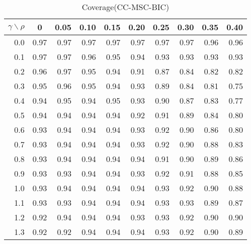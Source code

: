 \documentclass[12pt]{article}
\begin{document}
%
\begin{table}[!tbp]
\caption{Coverage(CC-MSC-BIC)}
 \begin{center}
 \begin{tabular}{r|rrrrrrrrr}\hline\hline
\multicolumn{1}{c|}{$\gamma\backslash\rho$}&\multicolumn{1}{c}{0}&\multicolumn{1}{c}{0.05}&\multicolumn{1}{c}{0.10}&\multicolumn{1}{c}{0.15}&\multicolumn{1}{c}{0.20}&\multicolumn{1}{c}{0.25}&\multicolumn{1}{c}{0.30}&\multicolumn{1}{c}{0.35}&\multicolumn{1}{c}{0.40}\tabularnewline
\hline

0.0&0.97&0.97&0.97&0.97&0.97&0.97&0.97&0.96&0.96\tabularnewline
0.1&0.97&0.97&0.96&0.95&0.94&0.93&0.93&0.93&0.93\tabularnewline
0.2&0.96&0.97&0.95&0.94&0.91&0.87&0.84&0.82&0.82\tabularnewline
0.3&0.95&0.96&0.95&0.94&0.93&0.89&0.84&0.81&0.75\tabularnewline
0.4&0.94&0.95&0.94&0.95&0.93&0.90&0.87&0.83&0.77\tabularnewline
0.5&0.94&0.94&0.94&0.94&0.92&0.91&0.89&0.84&0.80\tabularnewline
0.6&0.93&0.94&0.94&0.94&0.93&0.92&0.90&0.86&0.80\tabularnewline
0.7&0.93&0.94&0.94&0.94&0.93&0.92&0.90&0.88&0.83\tabularnewline
0.8&0.93&0.94&0.94&0.94&0.94&0.91&0.90&0.89&0.86\tabularnewline
0.9&0.93&0.93&0.94&0.94&0.93&0.92&0.91&0.88&0.85\tabularnewline
1.0&0.93&0.94&0.94&0.94&0.94&0.93&0.92&0.90&0.88\tabularnewline
1.1&0.93&0.93&0.94&0.94&0.94&0.93&0.93&0.89&0.87\tabularnewline
1.2&0.92&0.94&0.94&0.94&0.93&0.93&0.92&0.90&0.90\tabularnewline
1.3&0.92&0.92&0.94&0.94&0.94&0.93&0.92&0.90&0.89\tabularnewline
\hline
\end{tabular}

\end{center}

\end{table}
\end{document}
